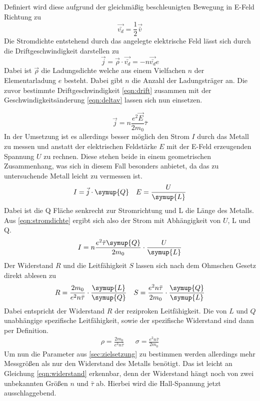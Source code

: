 Definiert wird diese aufgrund der gleichmäßig beschleunigten Bewegung in E-Feld Richtung zu
\begin{equation}
\label{eqn:drift}
\vec{\bar{v_{d}}} = \frac{1}{2} \vec{\bar{v}}
\end{equation}
Die Stromdichte entstehend durch das angelegte elektrische Feld lässt sich durch die Driftgeschwindigkeit darstellen zu
\begin{equation}
\label{eqn:stromdichteunddrift}
\vec{j} = \vec{\rho} \cdot \vec{\bar{v_{d}}} = - n \vec{\bar{v_{d}}} e
\end{equation}
Dabei ist $\vec{\rho}$ die Ladungsdichte welche aus einem Vielfachen $n$ der Elementarladung $e$ besteht. Dabei gibt $n$ die Anzahl der Ladungsträger an.
Die zuvor bestimmte Driftgeschwindigkeit \eqref{eqn:drift} zusammen mit der Geschwindigkeitsänderung \eqref{eqn:deltav} lassen sich nun einsetzen.

\begin{equation}
\label{eqn:stromdichte}
\vec{j} = n \frac{e^{2}\vec{E}}{2m_{0}} \bar{\tau}
\end{equation}
In der Umsetzung ist es allerdings besser möglich den Strom $I$ durch das Metall zu messen und anstatt der elektrischen Feldstärke $E$ mit der E-Feld erzeugenden Spannung $U$
zu rechnen. Diese stehen beide in einem geometrischen Zusammenhang, was sich in diesem Fall besonders anbietet, da das zu untersuchende Metall leicht zu vermessen ist.
\begin{align}
\label{eqn:querschnitt}
I = \vec{j} \cdot \symup{Q} && E = \frac{U}{\symup{L}}
\end{align}
Dabei ist die Q Fläche senkrecht zur Stromrichtung und L die Länge des Metalls.
Aus \eqref{eqn:stromdichte} ergibt sich also der Strom mit Abhängigkeit von $U$, L und Q.
\begin{equation}
\label{eqn:strom}
I = n \frac{e^{2}\bar{\tau} \symup{Q}}{2m_{0}} \cdot \frac{U}{\symup{L}}
\end{equation}
Der Widerstand $R$ und die Leitfähigkeit $S$ lassen sich nach dem Ohmschen Gesetz direkt ablesen zu
\begin{align}
\label{eqn:widerstand}
R = \frac{2m_{0}}{e^{2}n \bar{\tau}} \cdot \frac{\symup{L}}{\symup{Q}} && S = \frac{e^{2}n \bar{\tau}}{2m_{0}} \cdot \frac{\symup{Q}}{\symup{L}}
\end{align}
Dabei entspricht der Widerstand $R$ der reziproken Leitfähigkeit. Die von $L$ und $Q$ unabhängige spezifische Leitfähigkeit, sowie der spezifische Widerstand sind dann per Definition.
\begin{align}
\nonumber
\rho = \frac{2m_{0}}{e^{2}n \bar{\tau}} && \sigma = \frac{e^{2}n \bar{\tau}}{2m_{0}} 
\end{align}
Um nun die Parameter aus \ref{sec:zielsetzung} zu bestimmen werden allerdings mehr Messgrößen als nur den Widerstand des Metalls benötigt. Das ist leicht an Gleichung
\eqref{eqn:widerstand} erkennbar, denn der Widerstand hängt noch von zwei unbekannten Größen $n$ und $\bar{\tau}$ ab.
Hierbei wird die Hall-Spannung jetzt ausschlaggebend.

